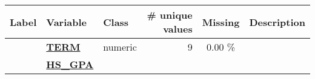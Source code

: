 \documentclass[]{article}
\begin{document}
\begin{longtable}[]{@{}lllrcl@{}}
\toprule
\begin{minipage}[b]{0.08\columnwidth}\raggedright\strut
Label\strut
\end{minipage} & \begin{minipage}[b]{0.28\columnwidth}\raggedright\strut
Variable\strut
\end{minipage} & \begin{minipage}[b]{0.12\columnwidth}\raggedright\strut
Class\strut
\end{minipage} & \begin{minipage}[b]{0.11\columnwidth}\raggedleft\strut
\# unique values\strut
\end{minipage} & \begin{minipage}[b]{0.10\columnwidth}\centering\strut
Missing\strut
\end{minipage} & \begin{minipage}[b]{0.13\columnwidth}\raggedright\strut
Description\strut
\end{minipage}\tabularnewline
\midrule
\endhead
\begin{minipage}[t]{0.08\columnwidth}\raggedright\strut
\strut
\end{minipage} & \begin{minipage}[t]{0.28\columnwidth}\raggedright\strut
\textbf{\protect\hyperlink{term}{TERM}}\strut
\end{minipage} & \begin{minipage}[t]{0.12\columnwidth}\raggedright\strut
numeric\strut
\end{minipage} & \begin{minipage}[t]{0.11\columnwidth}\raggedleft\strut
9\strut
\end{minipage} & \begin{minipage}[t]{0.10\columnwidth}\centering\strut
0.00 \%\strut
\end{minipage} & \begin{minipage}[t]{0.13\columnwidth}\raggedright\strut
\strut
\end{minipage}\tabularnewline
\begin{minipage}[t]{0.08\columnwidth}\raggedright\strut
\strut
\end{minipage} & \begin{minipage}[t]{0.28\columnwidth}\raggedright\strut
\textbf{\protect\hyperlink{hs_gpa}{HS\_GPA}}\strut
\end{minipage} & \begin{minipage}[t]{0.12\columnwidth}\raggedright\strut

\end{minipage}
\end{longtable}
\end{document}
